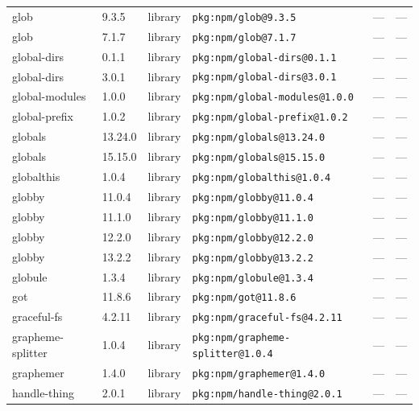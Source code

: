 \documentclass[11pt,a4paper]{article}
\begin{document}
\begin{longtable}{|p{4cm}|p{2cm}|p{1.6cm}|p{5cm}|p{1.5cm}|p{3.5cm}|}
\raggedright glob & 9.3.5 & library & \small\texttt{pkg:npm/glob@9.3.5} & — & \small — \\
\raggedright glob & 7.1.7 & library & \small\texttt{pkg:npm/glob@7.1.7} & — & \small — \\
\raggedright global-dirs & 0.1.1 & library & \small\texttt{pkg:npm/global-dirs@0.1.1} & — & \small — \\
\raggedright global-dirs & 3.0.1 & library & \small\texttt{pkg:npm/global-dirs@3.0.1} & — & \small — \\
\raggedright global-modules & 1.0.0 & library & \small\texttt{pkg:npm/global-modules@1.0.0} & — & \small — \\
\raggedright global-prefix & 1.0.2 & library & \small\texttt{pkg:npm/global-prefix@1.0.2} & — & \small — \\
\raggedright globals & 13.24.0 & library & \small\texttt{pkg:npm/globals@13.24.0} & — & \small — \\
\raggedright globals & 15.15.0 & library & \small\texttt{pkg:npm/globals@15.15.0} & — & \small — \\
\raggedright globalthis & 1.0.4 & library & \small\texttt{pkg:npm/globalthis@1.0.4} & — & \small — \\
\raggedright globby & 11.0.4 & library & \small\texttt{pkg:npm/globby@11.0.4} & — & \small — \\
\raggedright globby & 11.1.0 & library & \small\texttt{pkg:npm/globby@11.1.0} & — & \small — \\
\raggedright globby & 12.2.0 & library & \small\texttt{pkg:npm/globby@12.2.0} & — & \small — \\
\raggedright globby & 13.2.2 & library & \small\texttt{pkg:npm/globby@13.2.2} & — & \small — \\
\raggedright globule & 1.3.4 & library & \small\texttt{pkg:npm/globule@1.3.4} & — & \small — \\
\raggedright got & 11.8.6 & library & \small\texttt{pkg:npm/got@11.8.6} & — & \small — \\
\raggedright graceful-fs & 4.2.11 & library & \small\texttt{pkg:npm/graceful-fs@4.2.11} & — & \small — \\
\raggedright grapheme-splitter & 1.0.4 & library & \small\texttt{pkg:npm/grapheme-splitter@1.0.4} & — & \small — \\
\raggedright graphemer & 1.4.0 & library & \small\texttt{pkg:npm/graphemer@1.4.0} & — & \small — \\
\raggedright handle-thing & 2.0.1 & library & \small\texttt{pkg:npm/handle-thing@2.0.1} & — & \small — \\

\end{longtable}
\end{document}
